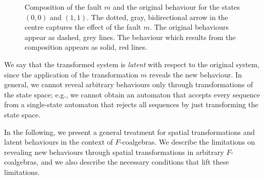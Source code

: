 \begin{figure}[t]
    \centering
    \caption{Composition of the fault $m$ and the original behaviour for the states $(0,0)$ and $(1,1)$. The dotted, gray, bidirectional arrow in the centre captures the effect of the fault $m$. The original behaviours appear as dashed, grey lines. The behaviour which results from the composition appears as solid, red lines.}
    \label{fig:ExampleWithFaults}
\end{figure}
We say that the transformed system is \emph{latent} with respect to the original system, since the application of the transformation $m$ reveals the new behaviour. In general, we cannot reveal arbitrary behaviours only through transformations of the state space; e.g., we cannot obtain an automaton that accepts every sequence from a single-state automaton that rejects all sequences by just transforming the state space. 

In the following, we present a general treatment for spatial transformations and latent behaviours in the context of $F$-coalgebras. We describe the limitations on revealing new behaviours through  spatial transformations in arbitrary $F$-coalgebras, and we also describe the necessary conditions that lift these limitations.

